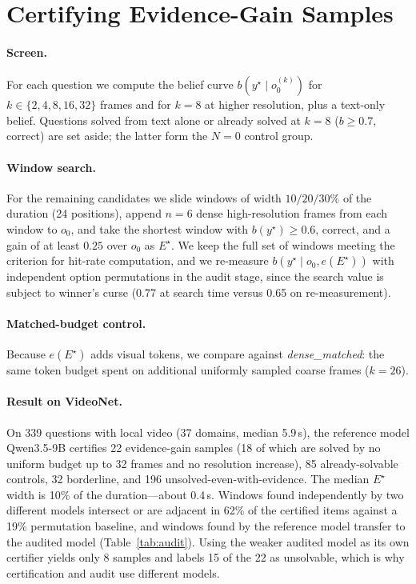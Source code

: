 \documentclass{article}
\newcommand{\estar}{E^{\star}}
\begin{document}
\section{Certifying Evidence-Gain Samples}
\label{sec:necessity}

\paragraph{Screen.} For each question we compute the belief curve $b(y^\star\mid o_0^{(k)})$ for $k\in\{2,4,8,16,32\}$ frames and for $k{=}8$ at higher resolution, plus a text-only belief. Questions solved from text alone or already solved at $k{=}8$ ($b\ge 0.7$, correct) are set aside; the latter form the $N{=}0$ control group.

\paragraph{Window search.} For the remaining candidates we slide windows of width $10/20/30\%$ of the duration (24 positions), append $n{=}6$ dense high-resolution frames from each window to $o_0$, and take the shortest window with $b(y^\star)\ge 0.6$, correct, and a gain of at least $0.25$ over $o_0$ as $\estar$. We keep the full set of windows meeting the criterion for hit-rate computation, and we re-measure $b(y^\star\mid o_0,e(\estar))$ with independent option permutations in the audit stage, since the search value is subject to winner's curse (0.77 at search time versus 0.65 on re-measurement).

\paragraph{Matched-budget control.} Because $e(\estar)$ adds visual tokens, we compare against \emph{dense\_matched}: the same token budget spent on additional uniformly sampled coarse frames ($k{=}26$).

\paragraph{Result on VideoNet.} On 339 questions with local video (37 domains, median 5.9\,s), the reference model Qwen3.5-9B certifies 22 evidence-gain samples (18 of which are solved by no uniform budget up to 32 frames and no resolution increase), 85 already-solvable controls, 32 borderline, and 196 unsolved-even-with-evidence. The median $\estar$ width is 10\% of the duration---about 0.4\,s. Windows found independently by two different models intersect or are adjacent in 62\% of the certified items against a 19\% permutation baseline, and windows found by the reference model transfer to the audited model (Table~\ref{tab:audit}). Using the weaker audited model as its own certifier yields only 8 samples and labels 15 of the 22 as unsolvable, which is why certification and audit use different models.
\end{document}
